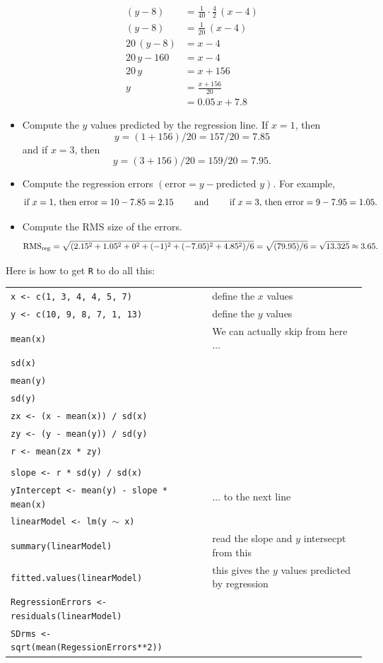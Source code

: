 \documentclass[10pt]{article}
\begin{document}
\begin{itemize}
\begin{align*}
(y-8) & = \frac{1}{40}\cdot\frac{4}{2}\,(x-4)\\
(y-8) & = \frac{1}{20}\,(x-4)\\
20\,(y-8) &= x-4\\
20\,y-160  & = x - 4\\
20\,y     & = x  + 156\\
y        & = \frac{x + 156}{20}\\
         & = 0.05\,x + 7.8
\end{align*}
%
\item Compute the $y$ values predicted by the regression line.  If $x=1$, then
\[y=(1 + 156)/20= 157/20 = 7.85\]
and if $x=3$, then
 \[y=(3 + 156)/20 = 159/20 = 7.95.\]
%
\item Compute the regression errors $(\mbox{error}=y - \mbox{predicted $y$})$.  
For example,
\[\mbox{if $x=1$, then $\mbox{error}=10-7.85=2.15$\hspace{20pt} and\hspace{20pt} if $x=3$, then
  $\mbox{error}=9-7.95=1.05$.}\]
\item Compute the RMS size of the errors.
\[\mbox{RMS}_{\mbox{\scriptsize reg}} = \sqrt{(2.15^2 + 1.05^2 + 0^2 + (-1)^2 + (-7.05)^2 + 4.85^2)/6} 
  = \sqrt{(79.95)/6}
  = \sqrt{13.325} \approx 3.65.\]
\end{itemize}
\bigskip

Here is how to get \texttt{R} to do all this:

\begin{tabular}{ll}
\texttt{x <- c(1,  3, 4, 4, 5, 7)} & define the $x$ values\\
\texttt{y <- c(10, 9, 8, 7, 1, 13)} & define the $y$ values\\
\texttt{mean(x)}                    & We can actually skip from here $\dots$\\
\texttt{sd(x)}   &\\
\texttt{mean(y)} & \\
\texttt{sd(y)}\\
\texttt{zx <- (x - mean(x)) / sd(x)} & \\
\texttt{zy <- (y - mean(y)) / sd(y)} & \\
\texttt{r <-  mean(zx * zy)} & \\
\\
\texttt{slope <- r * sd(y) / sd(x)} & \\
\texttt{yIntercept <- mean(y) - slope * mean(x)}  &  
         \hspace{30pt} $\dots$ to the next line\\[5pt]
\texttt{linearModel <- lm(y $\sim$ x)} \\
\texttt{summary(linearModel)} & read the slope and $y$ intersecpt from this\\
\texttt{fitted.values(linearModel)} & this gives the $y$ values predicted by regression\\
\texttt{RegressionErrors <- residuals(linearModel)} & \\
\texttt{SDrms <- sqrt(mean(RegessionErrors**2))}
\end{tabular}
\end{document}
